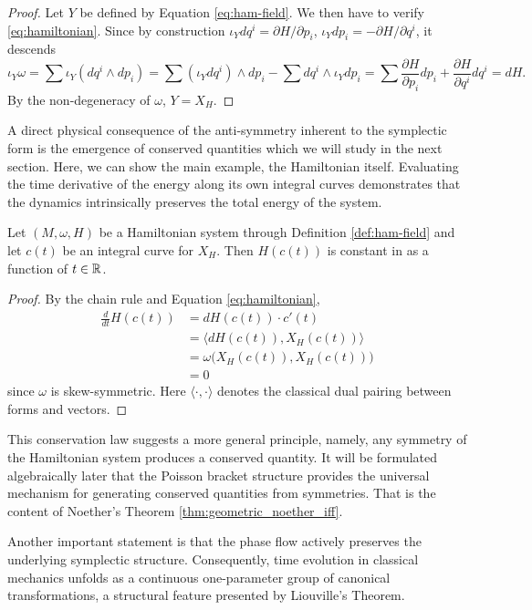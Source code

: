 \begin{proof}Let $Y$ be defined by Equation \eqref{eq:ham-field}. We then have to verify \ref{eq:hamiltonian}.
Since by construction $\iota_{Y} dq^i = \partial H/\partial p_i$, $\iota_{Y} dp_i = -\partial H/\partial q^i$, it descends
\[
\iota_{Y}\omega = \sum \iota_{Y}(dq^i \wedge dp_i) = \sum (\iota_{Y} dq^i) \wedge dp_i - \sum dq^i \wedge \iota_{Y} dp_i = \sum \frac{\partial H}{\partial p_i} dp_i + \frac{\partial H}{\partial q^i} dq^i = dH.
\]
By the non-degeneracy of $\omega$, $Y=X_H$.
\end{proof}
 A direct physical consequence of the anti-symmetry inherent to the symplectic form is the emergence of conserved quantities which we will study in the next section. Here, we can show the main example, the Hamiltonian itself. Evaluating the time derivative of the energy along its own integral curves demonstrates that the dynamics intrinsically preserves the total energy of the system.

\begin{proposition}\label{prop:cons-energy}
	Let $(M,\omega,H)$ be a Hamiltonian system through Definition \ref{def:ham-field} and let $c(t)$ be an integral curve for $X_H$. Then $H(c(t))$ is constant in as a function of $t \in \mathbb{R}$.
\end{proposition}
\begin{proof}
	By the chain rule and Equation \eqref{eq:hamiltonian},
\begin{align*}
	\frac{d}{dt} H(c(t)) &= dH(c(t)) \cdot c'(t) \\
	&= \langle dH(c(t)), X_H(c(t)) \rangle \\
	&= \omega\big(X_H(c(t)), X_H(c(t))\big) \\
	&= 0
\end{align*}
since $\omega$ is skew-symmetric.  Here $\langle \cdot, \cdot \rangle$ denotes the classical dual pairing between forms and vectors.
\end{proof}

This conservation law suggests a more general principle, namely, any symmetry of the Hamiltonian system produces a conserved quantity. It will be formulated algebraically later that the Poisson bracket structure provides the universal mechanism for generating conserved quantities from symmetries. That is the content of Noether's Theorem \ref{thm:geometric_noether_iff}.

Another important statement is that the phase flow actively preserves the underlying symplectic structure. Consequently, time evolution in classical mechanics unfolds as a continuous one-parameter group of canonical transformations, a structural feature presented by Liouville's Theorem.

